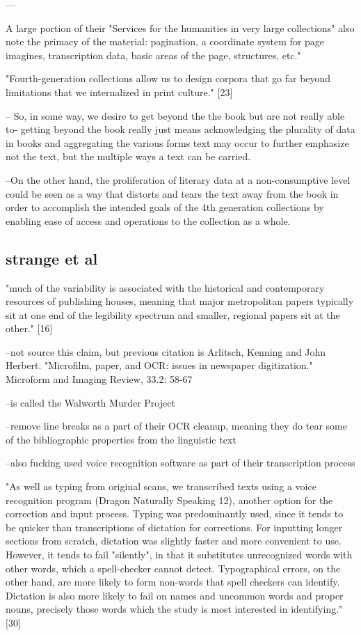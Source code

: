 \documentclass[course, english]{Notes}
\begin{document}
--- {A large portion of their "Services for the humanities in very large collections" also note the primacy of the material: pagination, a coordinate system for page imagines, transcription data, basic areas of the page, structures, etc." 

"Fourth-generation collections allow us to design corpora that go far beyond limitations that we internalized in print culture." [23]
	
	-- {So, in some way, we desire to get beyond the the book but are not really able to- getting beyond the book really just means acknowledging the plurality of data in books and aggregating the various forms text may occur to further emphasize not the text, but the multiple ways a text can be carried.}
	
	--{On the other hand, the proliferation of literary data at a non-consumptive level could be seen as a way that distorts and tears the text away from the book in order to accomplish the intended goals of the 4th generation collections by enabling ease of access and operations to the collection as a whole.}

\subsection{strange et al}

"much of the variability is associated with the historical and contemporary resources of publishing houses, meaning that major metropolitan papers typically sit at one end of the legibility spectrum and smaller, regional papers sit at the other." [16]
	 
	 --{not source this claim, but previous citation is Arlitsch, Kenning and John Herbert. "Microfilm, paper, and OCR: issues in newspaper digitization." Microform and Imaging Review, 33.2: 58-67}

	  --{is called the Walworth Murder Project}
	
--remove line breaks as a part of their OCR cleanup, meaning they do tear some of the bibliographic properties from the linguistic text}
 --a{lso fucking used voice recognition software as part of their transcription process}

"As well as typing from original scans, we transcribed texts using a voice recognition program (Dragon Naturally Speaking 12), another option for the correction and input process. Typing was predominantly used, since it tends to be quicker than transcriptions of dictation for corrections. For inputting longer sections from scratch, dictation was slightly faster and more convenient to use. However, it tends to fail "silently", in that it substitutes unrecognized words with other words, which a spell-checker cannot detect. Typographical errors, on the other hand, are more likely to form non-words that spell checkers can identify. Dictation is also more likely to fail on names and uncommon words and proper nouns, precisely those words which the study is most interested in identifying." [30]
\end{document}
